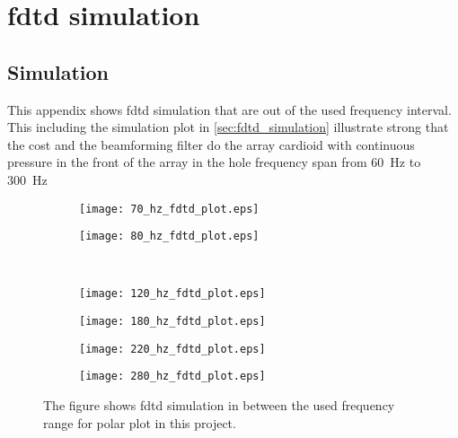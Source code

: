 \chapter{\gls{fdtd} simulation}\label{ap:fdtd_in_between}

\section{Simulation}
This appendix shows \gls{fdtd} simulation that are out of the used frequency interval. This including the simulation plot in \autoref{sec:fdtd_simulation} illustrate strong that the cost and the beamforming filter do the array cardioid with continuous pressure in the front of the array in the hole frequency span from \SI{60}{\hertz} to \SI{300}{\hertz}



\begin{figure}[H]
\begin{subfigure}[c]{0.5\textwidth}
\texttt{[image: 70\_hz\_fdtd\_plot.eps]}
\label{fig:ap:fdtd_70_hz}
\end{subfigure}
\begin{subfigure}[c]{0.5\textwidth}
\texttt{[image: 80\_hz\_fdtd\_plot.eps]}
\label{fig:ap:fdtd_80_hz}
\end{subfigure}\\
\hspace{0.1\textheight}
\begin{subfigure}[c]{0.5\textwidth}
\texttt{[image: 120\_hz\_fdtd\_plot.eps]}
\label{fig:ap:fdtd_120_hz}
\end{subfigure}
\begin{subfigure}[c]{0.5\textwidth}
\texttt{[image: 180\_hz\_fdtd\_plot.eps]}
\label{fig:ap:fdtd_180_hz}
\end{subfigure}
\begin{subfigure}[c]{0.5\textwidth}
\texttt{[image: 220\_hz\_fdtd\_plot.eps]}
\label{fig:ap:fdtd_220_hz}
\end{subfigure}
\begin{subfigure}[c]{0.5\textwidth}
\texttt{[image: 280\_hz\_fdtd\_plot.eps]}
\label{fig:ap:fdtd_280_hz}
\end{subfigure}
\caption{The figure shows \gls{fdtd} simulation in between the used frequency range for polar plot in this project.}
		\label{fig:ap:fdtd_between}
\end{figure}

